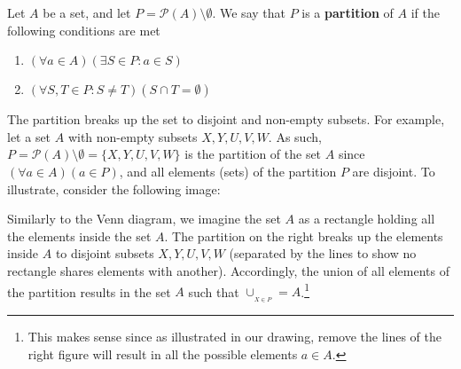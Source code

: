 \documentclass{tufte-handout} %
\theoremstyle{definition}
\theoremstyle{remark}
\begin{document}
Let $A$ be a set, and let $P = \mathcal{P}(A)\setminus \emptyset$. We say that $P$ is a \textbf{partition} of $A$ if the following conditions are met
\begin{enumerate}
    \item $(\forall a\in A)(\exists S\in P: a\in S)$
    \item $(\forall S,T \in P: S\neq T)(S \cap T = \emptyset)$
\end{enumerate}
The partition breaks up the set to disjoint and non-empty subsets. For example, let a set $A$ with non-empty subsets $X,Y,U,V,W$. As such, $P = \mathcal{P}(A)\setminus \emptyset = \{X,Y,U,V,W\}$ is the partition of the set $A$ since $(\forall a \in A)(a\in P)$, and all elements (sets) of the partition $P$ are disjoint. To illustrate, consider the following image:
\begin{center}
\hspace{1.0cm}
\end{center}
Similarly to the Venn diagram, we imagine the set $A$ as a rectangle holding all the elements inside the set $A$. The partition on the right breaks up the elements inside $A$ to disjoint subsets $X,Y,U,V,W$ (separated by the lines to show no rectangle shares elements with another). Accordingly, the union of all elements of the partition results in the set $A$ such that $\cup_{_{X\in P}}=A$.\footnote{This makes sense since as illustrated in our drawing, remove the lines of the right figure will result in all the possible elements $a \in A$.}
\end{document}
